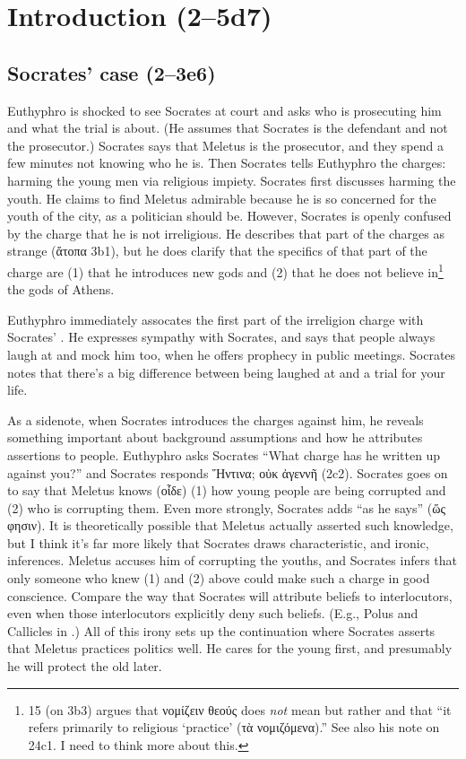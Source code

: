 \documentclass[11pt]{article}
\begin{document}

\section{Introduction (2--5d7)}

\subsection{Socrates' case (2--3e6)}

Euthyphro is shocked to see Socrates at court and asks who is prosecuting him and what the trial is about.  (He assumes that Socrates is the defendant and not the prosecutor.)  Socrates says that Meletus is the prosecutor, and they spend a few minutes not knowing who he is.  Then Socrates tells Euthyphro the charges: harming the young men via religious impiety.  Socrates first discusses harming the youth.  He claims to find Meletus admirable because he is so concerned for the youth of the city, as a politician should be.  However, Socrates is openly confused by the charge that he is not irreligious.  He describes that part of the charges as strange ({\g ἄτοπα} 3b1), but he does clarify that the specifics of that part of the charge are (1) that he introduces new gods and (2) that he does not believe in\footnote{\citet{burnet1924} 15 (on 3b3) argues that {\g νομίζειν θεούς} does \emph{not} mean  but rather  and that ``it refers primarily to religious `practice' ({\g τὰ νομιζόμενα}).''  See also his note on  24c1.  I need to think more about this.} the gods of Athens.

Euthyphro immediately assocates the first part of the irreligion charge with Socrates' .  He expresses sympathy with Socrates, and says that people always laugh at and mock him too, when he offers prophecy in public meetings.  Socrates notes that there's a big difference between being laughed at and a trial for your life.

As a sidenote, when Socrates introduces the charges against him, he reveals something important about background assumptions and how he attributes assertions to people.  Euthyphro asks Socrates ``What charge has he written up against you?'' and Socrates responds {\g Ἥντινα; οὐκ ἀγεννῆ} (2c2).  Socrates goes on to say that Meletus knows ({\g οἶδε}) (1) how young people are being corrupted and (2) who is corrupting them.  Even more strongly, Socrates adds ``as he says'' ({\g ὥς φησιν}).  It is theoretically possible that Meletus actually asserted such knowledge, but I think it's far more likely that Socrates draws characteristic, and ironic, inferences.  Meletus accuses him of corrupting the youths, and Socrates infers that only someone who knew (1) and (2) above could make such a charge in good conscience.  Compare the way that Socrates will attribute beliefs to interlocutors, even when those interlocutors explicitly deny such beliefs.  (E.g., Polus and Callicles in .) All of this irony sets up the continuation where Socrates asserts that Meletus practices politics well.  He cares for the young first, and presumably he will protect the old later.
\end{document}
